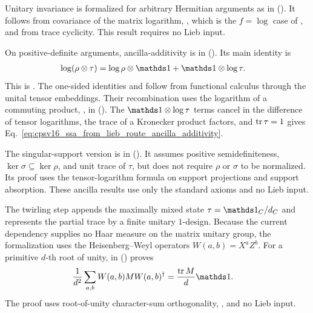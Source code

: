 \documentclass[11pt]{article}
\begin{document}
\begin{enumerate}
    Unitary invariance is formalized for arbitrary Hermitian arguments as
     in
    ().
    It follows from covariance of the matrix logarithm,
    , which is the $f=\log$ case of
    , and from trace cyclicity. This result
    requires no Lieb input.

    On positive-definite arguments, ancilla-additivity is
     in
    (). Its
    main identity is
    \begin{align}
        \log(\rho\otimes\tau)
            &= \log\rho\otimes\Id+\Id\otimes\log\tau.
        \label{eq:cpsv16_ssa_from_lieb_route_tensor_logarithm}
    \end{align}
    This is . The one-sided identities
     and
     follow from functional calculus through
    the unital tensor embeddings. Their recombination uses the logarithm of a
    commuting product, , in
    (). The
    $\Id\otimes\log\tau$ terms cancel in the difference of tensor logarithms,
    the trace of a Kronecker product factors, and $\operatorname{tr}\tau=1$ gives
    Eq.~\ref{eq:cpsv16_ssa_from_lieb_route_ancilla_additivity}.

    The singular-support version is
     in
    (). It assumes
    positive semidefiniteness, $\ker\sigma\subseteq\ker\rho$, and unit trace of
    $\tau$, but does not require $\rho$ or $\sigma$ to be normalized. Its proof
    uses the tensor-logarithm formula on support projections and support
    absorption. These ancilla results use only the standard \Lean{} axioms and
    no Lieb input.

    The twirling step appends the maximally mixed state
    $\tau=\Id_C/d_C$ and represents the partial trace by a finite unitary
    $1$-design. Because the current dependency supplies no Haar measure on the
    matrix unitary group, the formalization uses the Heisenberg--Weyl operators
    $W(a,b)=X^aZ^b$. For a primitive $d$-th root of unity,
     in
    () proves
    \begin{align}
        \frac{1}{d^2}\sum_{a,b}W(a,b)MW(a,b)^\dagger
            &= \frac{\tr M}{d}\Id.
        \label{eq:cpsv16_ssa_from_lieb_route_weyl_twirl}
    \end{align}
    The proof uses root-of-unity character-sum orthogonality,
    , and no Lieb input.


\end{enumerate}
\end{document}
